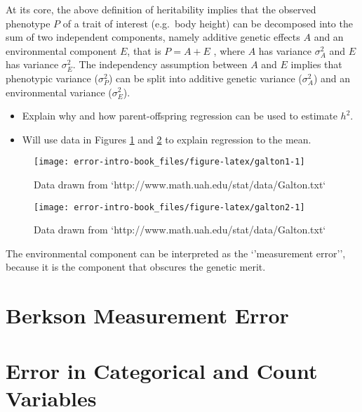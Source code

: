\documentclass[]{book}
\theoremstyle{definition}
\theoremstyle{definition}
\theoremstyle{definition}
\theoremstyle{remark}
\begin{document}
At its core, the above definition of heritability implies that the
observed phenotype \(P\) of a trait of interest (e.g.~body height) can
be decomposed into the sum of two independent components, namely
additive genetic effects \(A\) and an environmental component \(E\),
that is \(P = A + E\) , where \(A\) has variance \(\sigma_A^2\) and
\(E\) has variance \(\sigma^2_E\). The independency assumption between
\(A\) and \(E\) implies that phenotypic variance (\(\sigma_P^2\)) can be
split into additive genetic variance (\(\sigma_A^2\)) and an
environmental variance (\(\sigma_E^2\)).

\begin{itemize}
\item
  Explain why and how parent-offspring regression can be used to
  estimate \(h^2\).
\item
  Will use data in Figures \ref{fig:galton1} and \ref{fig:galton2} to
  explain regression to the mean.
\end{itemize}

\begin{figure}

{\centering \texttt{[image: error-intro-book\_files/figure-latex/galton1-1]} 

}

\caption{Data drawn from `http://www.math.uah.edu/stat/data/Galton.txt`}\label{fig:galton1}
\end{figure}

\begin{figure}

{\centering \texttt{[image: error-intro-book\_files/figure-latex/galton2-1]} 

}

\caption{Data drawn from `http://www.math.uah.edu/stat/data/Galton.txt`}\label{fig:galton2}
\end{figure}

The environmental component can be interpreted as the `'measurement
error'', because it is the component that obscures the genetic merit.

\citep{fuller1987, galton1886}

\section{Berkson Measurement Error}\label{berkson-measurement-error}

\section{Error in Categorical and Count
Variables}\label{error-in-categorical-and-count-variables}
\end{document}
